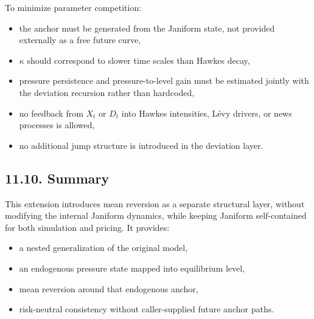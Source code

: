 \documentclass[11pt]{article}
\begin{document}
    To minimize parameter competition:
    \begin{itemize}
        \item the anchor must be generated from the Janiform state, not provided
        externally as a free future curve,
        \item \(\kappa\) should correspond to slower time scales than Hawkes decay,
        \item pressure persistence and pressure-to-level gain must be estimated
        jointly with the deviation recursion rather than hardcoded,
        \item no feedback from \(X_t\) or \(D_t\) into Hawkes intensities, Lévy
        drivers, or news processes is allowed,
        \item no additional jump structure is introduced in the deviation layer.
    \end{itemize}

    \subsection*{11.10. Summary}

    This extension introduces mean reversion as a separate structural layer,
    without modifying the internal Janiform dynamics, while keeping Janiform
    self-contained for both simulation and pricing. It provides:
    \begin{itemize}
        \item a nested generalization of the original model,
        \item an endogenous pressure state mapped into equilibrium level,
        \item mean reversion around that endogenous anchor,
        \item risk-neutral consistency without caller-supplied future anchor paths.
    \end{itemize}
\end{document}

